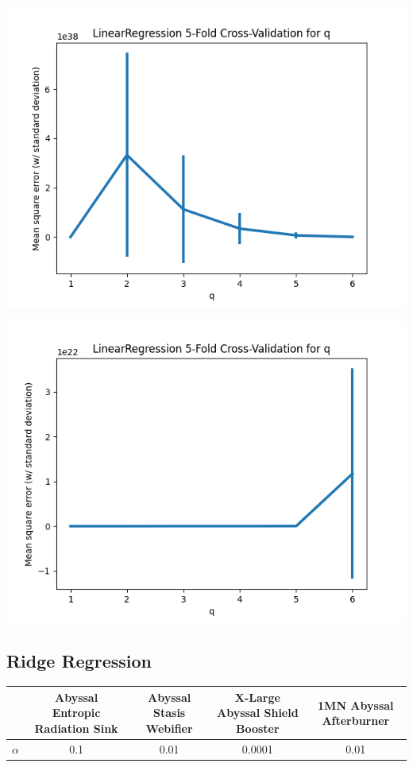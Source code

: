 \documentclass[10pt]{article}
\begin{document}
			\begin{minipage}{0.3\linewidth}
				\includegraphics[width=\linewidth]{../graphs/afterburner_linreg_polyfeatures_crossval.png}
			\end{minipage}%
			\begin{minipage}{0.3\linewidth}
				\includegraphics[width=\linewidth]{../graphs/entropic_radiation_sink_linreg_polyfeatures_crossval.png}
			\end{minipage}
		
	\subsection{Ridge Regression}		
		\begin{tabular}{|c|c|c|c|c|}
			\hline
			& Abyssal Entropic Radiation Sink & Abyssal Stasis Webifier & X-Large Abyssal Shield Booster & 1MN Abyssal Afterburner\\
			\hline
			$\alpha$ & 0.1 & 0.01 & 0.0001 & 0.01\\
			\hline
		\end{tabular}
	
\end{document}
